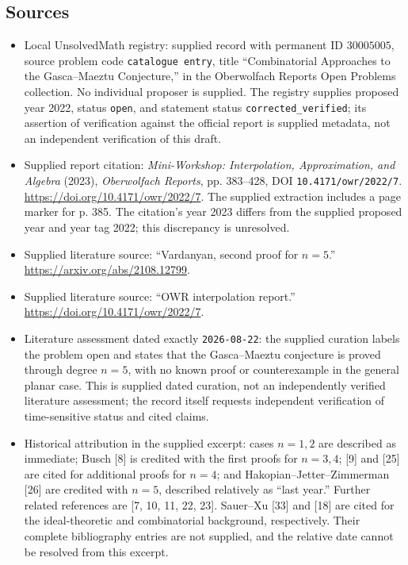 \documentclass[11pt]{article}
\begin{document}
\subsection{Sources}
\begin{itemize}
\item Local UnsolvedMath registry: supplied record with permanent ID \(30005005\), source problem code \texttt{catalogue entry}, title ``Combinatorial Approaches to the Gasca--Maeztu Conjecture,'' in the Oberwolfach Reports Open Problems collection. No individual proposer is supplied. The registry supplies proposed year 2022, status \texttt{open}, and statement status \texttt{corrected\_verified}; its assertion of verification against the official report is supplied metadata, not an independent verification of this draft.
\item Supplied report citation: \emph{Mini-Workshop: Interpolation, Approximation, and Algebra} (2023), \emph{Oberwolfach Reports}, pp. 383--428, DOI \texttt{10.4171/owr/2022/7}. \url{https://doi.org/10.4171/owr/2022/7}. The supplied extraction includes a page marker for p. 385. The citation's year 2023 differs from the supplied proposed year and year tag 2022; this discrepancy is unresolved.
\item Supplied literature source: ``Vardanyan, second proof for \(n=5\).'' \url{https://arxiv.org/abs/2108.12799}.
\item Supplied literature source: ``OWR interpolation report.'' \url{https://doi.org/10.4171/owr/2022/7}.
\item Literature assessment dated exactly \texttt{2026-08-22}: the supplied curation labels the problem open and states that the Gasca--Maeztu conjecture is proved through degree \(n=5\), with no known proof or counterexample in the general planar case. This is supplied dated curation, not an independently verified literature assessment; the record itself requests independent verification of time-sensitive status and cited claims.
\item Historical attribution in the supplied excerpt: cases \(n=1,2\) are described as immediate; Busch [8] is credited with the first proofs for \(n=3,4\); [9] and [25] are cited for additional proofs for \(n=4\); and Hakopian--Jetter--Zimmerman [26] are credited with \(n=5\), described relatively as ``last year.'' Further related references are [7, 10, 11, 22, 23]. Sauer--Xu [33] and [18] are cited for the ideal-theoretic and combinatorial background, respectively. Their complete bibliography entries are not supplied, and the relative date cannot be resolved from this excerpt.
\end{itemize}
\end{document}
